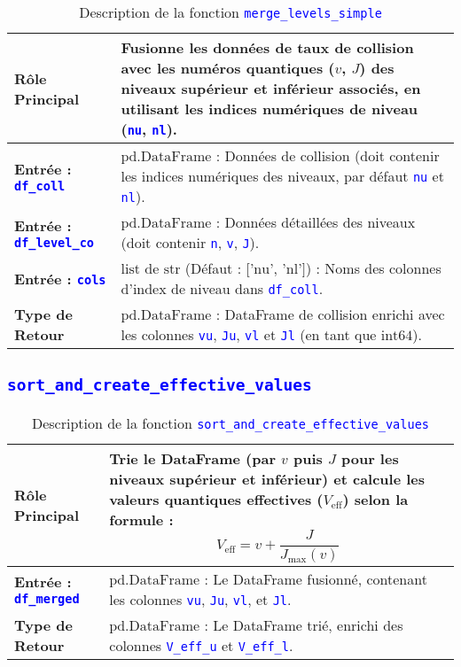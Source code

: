 \documentclass{article}
\newcommand{\code}[1]{\texttt{\textcolor{blue}{#1}}}
\begin{document}
\begin{longtable}{|>{\raggedright\arraybackslash}p{}|>{\raggedright\arraybackslash}p{}|}
    \caption{Description de la fonction \code{merge\_levels\_simple}} \\
    \toprule
    \textbf{Rôle Principal} & Fusionne les données de taux de collision avec les numéros quantiques ($v$, $J$) des niveaux supérieur et inférieur associés, en utilisant les indices numériques de niveau (\code{nu}, \code{nl}). \\
    \midrule
    \textbf{Entrée : \code{df\_coll}} & $\text{pd.DataFrame}$ : Données de collision (doit contenir les indices numériques des niveaux, par défaut \code{nu} et \code{nl}). \\
    \midrule
    \textbf{Entrée : \code{df\_level\_co}} & $\text{pd.DataFrame}$ : Données détaillées des niveaux (doit contenir \code{n}, \code{v}, \code{J}). \\
    \midrule
    \textbf{Entrée : \code{cols}} & $\text{list}$ de $\text{str}$ (Défaut : $\text{['nu', 'nl']}$) : Noms des colonnes d'index de niveau dans \code{df\_coll}. \\
    \midrule
    \textbf{Type de Retour} & $\text{pd.DataFrame}$ : DataFrame de collision enrichi avec les colonnes \code{vu}, \code{Ju}, \code{vl} et \code{Jl} (en tant que $\text{int64}$). \\
    \bottomrule
\end{longtable}

\subsection{\code{sort\_and\_create\_effective\_values}}

\begin{longtable}{|>{\raggedright\arraybackslash}p{}|>{\raggedright\arraybackslash}p{}|}
    \caption{Description de la fonction \code{sort\_and\_create\_effective\_values}} \\
    \toprule
    \textbf{Rôle Principal} & Trie le DataFrame (par $v$ puis $J$ pour les niveaux supérieur et inférieur) et calcule les valeurs quantiques effectives ($V_{\text{eff}}$) selon la formule :
    $$V_{\text{eff}} = v + \frac{J}{J_{\text{max}}(v)}$$
    \\
    \midrule
    \textbf{Entrée : \code{df\_merged}} & $\text{pd.DataFrame}$ : Le DataFrame fusionné, contenant les colonnes \code{vu}, \code{Ju}, \code{vl}, et \code{Jl}. \\
    \midrule
    \textbf{Type de Retour} & $\text{pd.DataFrame}$ : Le DataFrame trié, enrichi des colonnes \code{V\_eff\_u} et \code{V\_eff\_l}. \\
    \bottomrule
\end{longtable}
\end{document}

